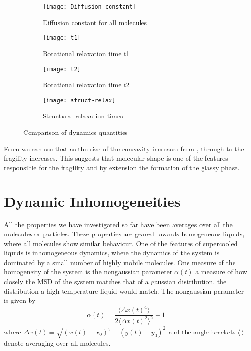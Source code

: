 \begin{figure}
    \begin{subfigure}{0.5\linewidth}
        \texttt{[image: Diffusion-constant]}
        \caption{Diffusion constant for all molecules}
        \label{fig:diffusion constant}
    \end{subfigure}
    \begin{subfigure}{0.5\linewidth}
        \texttt{[image: t1]}
        \caption{Rotational relaxation time t1}
        \label{fig:tau1}
    \end{subfigure}
    \begin{subfigure}{0.5\textwidth}
        \texttt{[image: t2]}
        \caption{Rotational relaxation time t2}
        \label{fig:tau2}
    \end{subfigure}
    \begin{subfigure}{0.5\textwidth}
        \texttt{[image: struct-relax]}
        \caption{Structural relaxation times}
        \label{fig:struct relax}
    \end{subfigure}
    \caption{Comparison of dynamics quantities}
    \label{fig:dynamic comparison}
\end{figure}

From  we can see that as the size of the concavity increases from \sone, through \scon to \tri the fragility increases. This suggests that molecular shape is one of the features responsible for the fragility and by extension the formation of the glassy phase.


\section{Dynamic Inhomogeneities}

All the properties we have investigated so far have been averages over all the molecules or particles. These properties are geared towards homogeneous liquids, where all molecules show similar behaviour. One of the features of supercooled liquids is inhomogeneous dynamics, where the dynamics of the system is dominated by a small number of highly mobile molecules. One measure of the homogeneity of the system is the nongaussian parameter $\alpha(t)$ a measure of how closely the MSD of the system matches that of a gaussian distribution, the distribution a high temperature liquid would match. The nongaussian parameter is given by
\begin{equation}
    \alpha(t) = \frac{\langle \Delta x(t)^4 \rangle}{2 \langle \Delta x(t)^2\rangle^2} - 1
\end{equation}
where $\Delta x(t) = \sqrt{(x(t) - x_0)^2 + (y(t) - y_0)^2}$ and the angle brackets $\langle\,\rangle$ denote averaging over all molecules.

